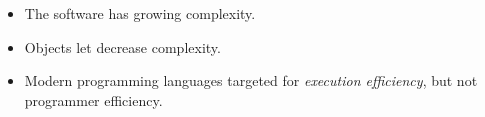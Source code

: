 
\begin{itemize}
  \item 
The software has growing complexity.
  \item 
Objects let decrease complexity.
  \item 
Modern programming languages targeted for \emph{execution efficiency}, but not
\textcolor{ref}{programmer efficiency}.
\end{itemize}
